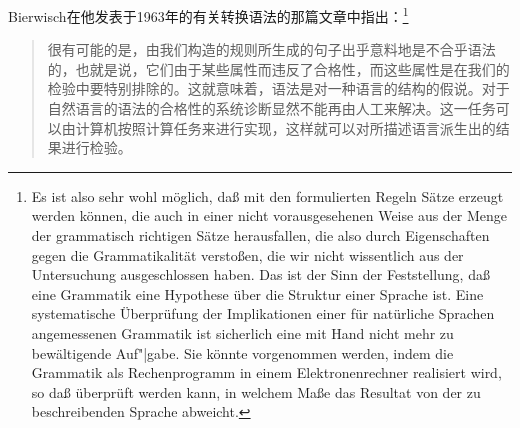 Bierwisch在他发表于1963年的有关转换语法的那篇文章中指出：\footnote{
Es ist also sehr wohl möglich, daß mit den formulierten Regeln Sätze erzeugt werden können,
die auch in einer nicht vorausgesehenen Weise aus der Menge der grammatisch richtigen Sätze herausfallen,
die also durch Eigenschaften gegen die Grammatikalität verstoßen, die wir nicht wissentlich aus
der Untersuchung ausgeschlossen haben. Das ist der Sinn der Feststellung, daß eine Grammatik
eine Hypothese über die Struktur einer Sprache ist. Eine systematische Überprüfung der Implikationen
einer für natürliche Sprachen angemessenen Grammatik ist sicherlich eine mit Hand nicht mehr
zu bewältigende Auf"|gabe. Sie könnte vorgenommen werden, indem die Grammatik als Rechenprogramm in einem
Elektronenrechner realisiert wird, so daß überprüft werden kann, in welchem Maße das Resultat
von der zu beschreibenden Sprache abweicht.}
\begin{quote}
很有可能的是，由我们构造的规则所生成的句子出乎意料地是不合乎语法的，也就是说，它们由于某些属性而违反了合格性，而这些属性是在我们的检验中要特别排除的。这就意味着，语法是对一种语言的结构的假说。对于自然语言的语法的合格性的系统诊断显然不能再由人工来解决。这一任务可以由计算机按照计算任务来进行实现，这样就可以对所描述语言派生出的结果进行检验。\citep*[]{Bierwisch63}
\end{quote}
